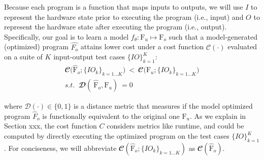 \documentclass{article}
\newcommand\p{\ensuremath{{\mathrm{F}_u}}}
\begin{document}
Because each program is a function that maps inputs to outputs, we will use $I$ to represent the hardware state prior to executing the program (i.e., input) and $O$ to represent the hardware state after executing the program (i.e., output).
Specifically, our goal is to learn a   model $f_{\theta}: \text{F}_u \mapsto \text{F}_o$ such that a model-generated (optimized) program $\hat{F_o}$ attains lower cost under a cost function $\mathcal{C}(\cdot)$ evaluated on a suite of $K$ input-output test cases $\{ IO \}_{k=1}^K$:
\begin{equation}
    \label{eqn:optimizaiton_goal}
    \begin{split}
        \mathbfcal{C} \Big(\hat{\textrm{F}}_{o}; \{IO_k\}_{k=1...K} \Big)  \ 
        < \ 
        \mathbfcal{C} \Big(\textrm{F}_{u}; \{IO_k\}_{k=1...K}\Big) \\
         s.t. \;\; \mathbfcal{D}( \ 
                        \hat{\textrm{F}}_{o}, \textrm{F}_{u} ) \ 
                        = 0  %
    \end{split}
\end{equation}

where $\mathcal{D}(\cdot) \in \{ 0, 1 \}$ is a distance metric that measures if the model optimized program $\hat{F}_o$ is functionally equivalent to the original one $\p$. 
As we explain in Section xxx, the cost function $C$ considers metrics like runtime, and could be computed by directly executing the optimized program on the test cases $\{ IO \}_{k=1}^K$.
For conciseness, we will abbreviate $\mathbfcal{C} (\hat{\textrm{F}}_{o}; \{IO_k\}_{k=1...K})$  as $\mathbfcal{C} (\hat{\textrm{F}}_{o})$. 
\end{document}
